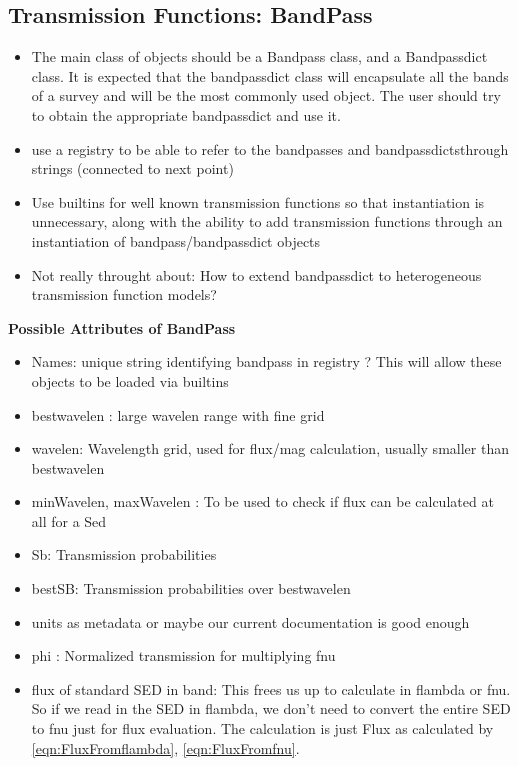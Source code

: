 \documentclass{article}[12pt]
\begin{document}
\subsection{Transmission Functions: BandPass} 
\begin{itemize}
    \item The main class of objects should be a Bandpass class, and a Bandpassdict class. It is expected that the bandpassdict class will encapsulate all the bands of a survey and will be the most commonly used object. The user should try to obtain the appropriate bandpassdict and use it.
    \item use a registry to be able to refer to the bandpasses and bandpassdictsthrough strings (connected to next point)
    \item Use builtins for well known transmission functions so that instantiation is unnecessary, along with the ability to add transmission functions through an instantiation of bandpass/bandpassdict objects
    \item Not really throught about: How to extend bandpassdict to heterogeneous transmission function models?
\end{itemize}
\textbf{Possible Attributes of BandPass}
\begin{itemize}
    \item Names: unique string identifying bandpass in registry ? This will allow these objects to be loaded via builtins
    \item bestwavelen : large wavelen range with fine grid 
    \item wavelen: Wavelength grid, used for flux/mag calculation, usually smaller than bestwavelen
    \item minWavelen, maxWavelen : To be used to check if flux can be calculated at all for a Sed
    \item Sb: Transmission  probabilities
    \item bestSB: Transmission probabilities over bestwavelen
    \item units as metadata or maybe our current documentation is good enough
    \item phi : Normalized transmission for multiplying fnu 
    \item flux of standard SED in band: This frees us up to calculate in flambda or fnu. So if we read in the SED in flambda, we don't need to convert the entire SED to fnu just for flux evaluation. The calculation is just Flux 
        as calculated by \ref{eqn:FluxFromflambda}, \ref{eqn:FluxFromfnu}. 
\end{itemize}
\end{document}
